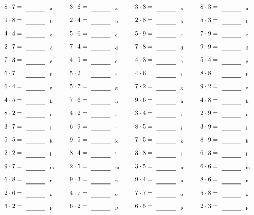 \documentclass
[
  draft    = true,
  fontsize = 11pt,
  parskip  = half-
]
{scrartcl}
\begin{document}
\par\vfill\par
\begin{align*}
    \pline{8\cdot7}&=\rline{a}
  & \pline{3\cdot6}&=\rline{a}
  & \pline{3\cdot3}&=\rline{a}
  & \pline{8\cdot3}&=\rline{a} \\[1ex]
    \pline{9\cdot8}&=\rline{b}
  & \pline{2\cdot4}&=\rline{b}
  & \pline{2\cdot8}&=\rline{b}
  & \pline{5\cdot3}&=\rline{b} \\[1ex]
    \pline{4\cdot4}&=\rline{c}
  & \pline{5\cdot6}&=\rline{c}
  & \pline{5\cdot9}&=\rline{c}
  & \pline{7\cdot9}&=\rline{c} \\[1ex]
    \pline{2\cdot7}&=\rline{d}
  & \pline{7\cdot4}&=\rline{d}
  & \pline{7\cdot8}&=\rline{d}
  & \pline{9\cdot9}&=\rline{d} \\[1ex]
    \pline{7\cdot3}&=\rline{e}
  & \pline{4\cdot9}&=\rline{e}
  & \pline{4\cdot3}&=\rline{e}
  & \pline{5\cdot4}&=\rline{e} \\[1ex]
    \pline{6\cdot7}&=\rline{f}
  & \pline{5\cdot2}&=\rline{f}
  & \pline{4\cdot6}&=\rline{f}
  & \pline{8\cdot8}&=\rline{f} \\[1ex]
    \pline{6\cdot4}&=\rline{g}
  & \pline{5\cdot7}&=\rline{g}
  & \pline{7\cdot2}&=\rline{g}
  & \pline{9\cdot2}&=\rline{g} \\[1ex]
    \pline{4\cdot5}&=\rline{h}
  & \pline{7\cdot6}&=\rline{h}
  & \pline{9\cdot6}&=\rline{h}
  & \pline{4\cdot8}&=\rline{h} \\[1ex]
    \pline{8\cdot2}&=\rline{i}
  & \pline{4\cdot2}&=\rline{i}
  & \pline{3\cdot4}&=\rline{i}
  & \pline{2\cdot9}&=\rline{i} \\[1ex]
    \pline{3\cdot7}&=\rline{j}
  & \pline{6\cdot9}&=\rline{j}
  & \pline{8\cdot5}&=\rline{j}
  & \pline{3\cdot9}&=\rline{j} \\[1ex]
    \pline{5\cdot5}&=\rline{k}
  & \pline{9\cdot5}&=\rline{k}
  & \pline{7\cdot5}&=\rline{k}
  & \pline{8\cdot9}&=\rline{k} \\[1ex]
    \pline{2\cdot2}&=\rline{l}
  & \pline{8\cdot4}&=\rline{l}
  & \pline{3\cdot8}&=\rline{l}
  & \pline{6\cdot3}&=\rline{l} \\[1ex]
    \pline{9\cdot7}&=\rline{m}
  & \pline{2\cdot5}&=\rline{m}
  & \pline{3\cdot5}&=\rline{m}
  & \pline{6\cdot6}&=\rline{m} \\[1ex]
    \pline{6\cdot8}&=\rline{n}
  & \pline{9\cdot3}&=\rline{n}
  & \pline{9\cdot4}&=\rline{n}
  & \pline{8\cdot6}&=\rline{n} \\[1ex]
    \pline{2\cdot6}&=\rline{o}
  & \pline{4\cdot7}&=\rline{o}
  & \pline{7\cdot7}&=\rline{o}
  & \pline{5\cdot8}&=\rline{o} \\[1ex]
    \pline{3\cdot2}&=\rline{p}
  & \pline{6\cdot2}&=\rline{p}
  & \pline{6\cdot5}&=\rline{p}
  & \pline{2\cdot3}&=\rline{p}
\end{align*}
\end{document}
